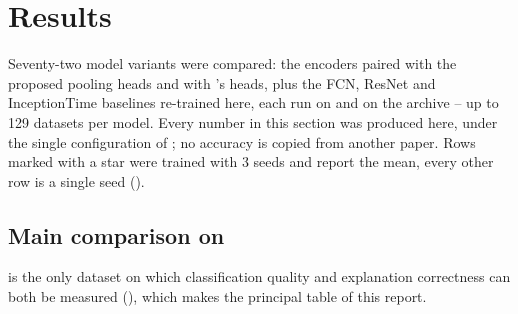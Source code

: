 %

\section{Results}
\label{sec:results}

Seventy-two model variants were compared: the \seanet{} encoders paired with the proposed pooling
heads and with \millet{}'s heads, plus the FCN, ResNet and InceptionTime baselines re-trained here,
each run on \webtraffic{} and on the \ucr{} archive -- up to 129 datasets per model. Every number in
this section was produced here, under the single configuration of ; no accuracy is
copied from another paper. Rows marked with a star were trained with 3 seeds and report the mean,
every other row is a single seed ().

\subsection{Main comparison on \webtraffic{}}
\label{sec:res:web}

\webtraffic{} is the only dataset on which classification quality and explanation correctness can
both be measured (), which makes  the principal table of
this report.

